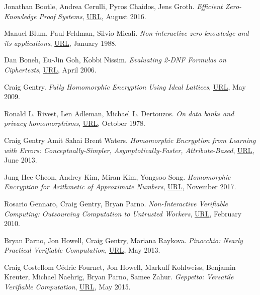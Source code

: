 \documentclass{Resources/UoBLab1}
\theoremstyle{definition}
\begin{document}
\begin{thebibliography}{10}
 Jonathan Bootle, Andrea Cerulli, Pyros Chaidos, Jens Groth. \textit{Efficient Zero-Knowledge Proof Systems}, \href{https://link.springer.com/chapter/10.1007/978-3-319-43005-8_1}{URL}, August 2016.

 Manuel Blum, Paul Feldman, Silvio Micali. \textit{Non-interactive zero-knowledge and its applications}, \href{https://doi.org/10.1145/62212.62222}{URL}, January 1988. 

 Dan Boneh, Eu-Jin Goh, Kobbi Nissim. \textit{Evaluating 2-DNF Formulas on Ciphertexts}, \href{https://crypto.stanford.edu/~dabo/papers/2dnf.pdf}{URL}, April 2006.

 Craig Gentry. \textit{Fully Homomorphic Encryption Using Ideal Lattices}, \href{https://www.cs.cmu.edu/~odonnell/hits09/gentry-homomorphic-encryption.pdf}{URL}, May 2009.

 Ronald L. Rivest, Len Adleman, Michael L. Dertouzos. \textit{On data banks and privacy homomorphisms}, \href{https://luca-giuzzi.unibs.it/corsi/Support/papers-cryptography/RAD78.pdf}{URL}, October 1978.

 Craig Gentry Amit Sahai Brent Waters. \textit{Homomorphic Encryption from Learning with Errors: Conceptually-Simpler, Asymptotically-Faster, Attribute-Based}, \href{https://eprint.iacr.org/2013/340.pdf}{URL}, June 2013.

 Jung Hee Cheon, Andrey Kim, Miran Kim, Yongsoo Song. \textit{Homomorphic Encryption for Arithmetic of Approximate Numbers}, \href{https://link.springer.com/chapter/10.1007/978-3-319-70694-8_15}{URL}, November 2017.

 Rosario Gennaro, Craig Gentry, Bryan Parno. \textit{Non-Interactive Verifiable Computing: Outsourcing Computation to Untrusted Workers}, \href{https://eprint.iacr.org/2009/547.pdf}{URL}, February 2010.

 Bryan Parno, Jon Howell, Craig Gentry, Mariana Raykova. \textit{Pinocchio: Nearly Practical Verifiable Computation}, \href{https://eprint.iacr.org/2013/279.pdf}{URL}, May 2013.

 Craig Costellom Cédric Fournet, Jon Howell, Markulf Kohlweiss, Benjamin Kreuter, Michael Naehrig, Bryan Parno, Samee Zahur. \textit{Geppetto: Versatile Verifiable Computation}, \href{https://ieeexplore.ieee.org/stamp/stamp.jsp?tp=&arnumber=7163030}{URL}, May 2015.


\end{thebibliography}
\end{document}
